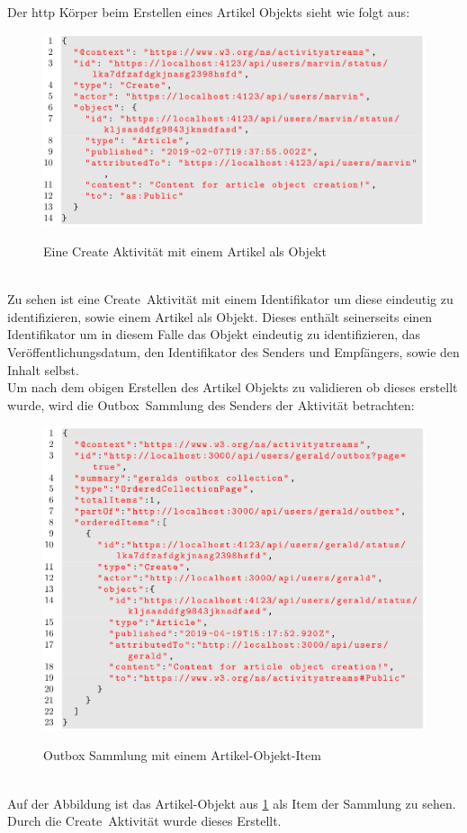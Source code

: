 Der \gls{http} Körper beim Erstellen eines Artikel Objekts sieht wie folgt aus:
\begin{figure}[h]
	\centering
	\includegraphics[scale=0.45]{figures/create-activity-article-object.png}
	\label{fig:create-activity-article-object}
	\caption{Eine Create Aktivität mit einem Artikel als Objekt}
\end{figure}\\
Zu sehen ist eine \glqq Create\grqq~Aktivität mit einem Identifikator um diese eindeutig zu identifizieren, sowie einem Artikel als Objekt. Dieses enthält seinerseits einen Identifikator um in diesem Falle das Objekt eindeutig zu identifizieren, das Veröffentlichungsdatum, den Identifikator des Senders und Empfängers, sowie den Inhalt selbst.\\

Um nach dem obigen Erstellen des Artikel Objekts zu validieren ob dieses erstellt wurde, wird die \glqq Outbox\grqq~Sammlung des Senders der Aktivität betrachten:
\begin{figure}[h]
	\centering
	\includegraphics[scale=0.45]{figures/create-activity-article-object-result.png}
	\label{fig:create-activity-article-object-result}
	\caption{Outbox Sammlung mit einem Artikel-Objekt-Item}
\end{figure}\\
Auf der Abbildung ist das Artikel-Objekt aus \ref{fig:create-activity-article-object} als Item der Sammlung zu sehen. Durch die \glqq Create\grqq~Aktivität wurde dieses Erstellt.
